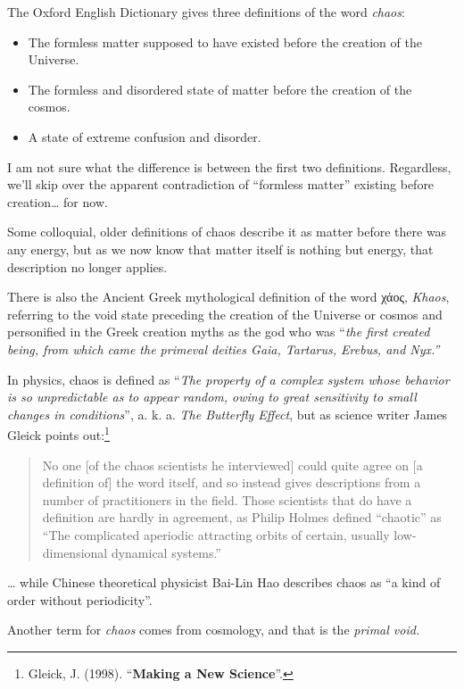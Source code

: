 \documentclass[
]{article}
\begin{document}
The Oxford English Dictionary gives three definitions of the word
\emph{chaos}:

\begin{itemize}
\item
  The formless matter supposed to have existed before the creation of
  the Universe.
\item
  The formless and disordered state of matter before the creation of the
  cosmos.
\item
  A state of extreme confusion and disorder.
\end{itemize}

I am not sure what the difference is between the first two definitions.
Regardless, we'll skip over the apparent contradiction of ``formless
matter'' existing before creation\ldots{} for now.

Some colloquial, older definitions of chaos describe it as matter before
there was any energy, but as we now know that matter itself is nothing
but energy, that description no longer applies.

There is also the Ancient Greek mythological definition of the word
χάος, \emph{Khaos}, referring to the void state preceding the creation
of the Universe or cosmos and personified in the Greek creation myths as
the god who was ``\emph{the first created being, from which came the
primeval deities Gaia, Tartarus, Erebus, and Nyx.''}

In physics, chaos is defined as ``\emph{The property of a complex system
whose behavior is so unpredictable as to appear random, owing to great
sensitivity to small changes in conditions}'', a. k. a. \emph{The
Butterfly Effect}, but as science writer James Gleick points
out:\footnote{Gleick, J. (1998). ``\textbf{Making a New Science}''.}

\begin{quote}
No one {[}of the chaos scientists he interviewed{]} could quite agree on
{[}a definition of{]} the word itself, and so instead gives descriptions
from a number of practitioners in the field. Those scientists that do
have a definition are hardly in agreement, as Philip Holmes defined
``chaotic'' as ``The complicated aperiodic attracting orbits of certain,
usually low-dimensional dynamical systems.''
\end{quote}

\ldots{} while Chinese theoretical physicist Bai-Lin Hao describes chaos
as ``a kind of order without periodicity''.

Another term for \emph{chaos} comes from cosmology, and that is the
\emph{primal void.}
\end{document}
